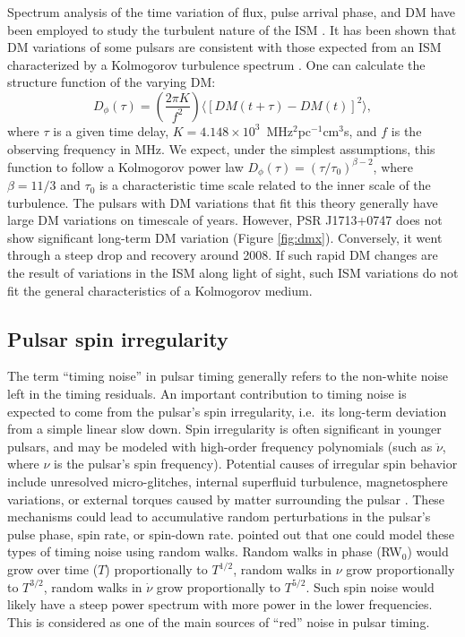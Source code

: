 Spectrum analysis of the time variation of flux, pulse arrival phase, and DM have 
been employed to study the turbulent nature of the ISM \citep[e.g.][]{cpl86, rl90}.
It has been shown that DM variations of some pulsars are consistent with
those expected from an ISM characterized by a Kolmogorov turbulence spectrum
\citep{cwd+90, ric90, ktr94, yhc+07, kcs+13, fst14}. One can calculate the 
structure function of the varying DM: 
\begin{equation}
D_{\phi}(\tau)=\left(\frac{2\pi K}{f^2}\right)\langle [DM(t+\tau)-DM(t)]^2\rangle, 
\end{equation}
where $\tau$ 
is a given time delay, $K=4.148\times10^3$~MHz$^2$pc$^{-1}$cm$^3$s, and $f$ is 
the observing frequency in MHz. We expect, under the simplest assumptions, 
this function to follow a Kolmogorov power law $D_{\phi}(\tau)=(\tau/\tau_0)^{\beta -2}$, 
where $\beta=11/3$ and $\tau_0$ is a characteristic time scale related to 
the inner scale of the turbulence. The pulsars with DM variations that fit this
theory generally have large DM variations on timescale of 
years. However, PSR J1713+0747 does not show significant long-term DM variation 
(Figure \ref{fig:dmx}). Conversely, it went through a steep drop and recovery 
around 2008. If such rapid DM changes are the result of variations in the ISM along
light of sight, such ISM variations do not fit the general characteristics of
a Kolmogorov medium. 


\subsection{Pulsar spin irregularity}
\label{sec:spin}

The term ``timing noise'' in pulsar timing generally refers to the non-white
noise left in the timing residuals.
An important contribution to timing noise is expected to come from the pulsar's spin
irregularity, i.e.~its long-term deviation from a simple linear slow down. 
Spin irregularity is often significant in younger pulsars, and 
may be modeled with high-order frequency polynomials (such as $\ddot{\nu}$, where $\nu$ is the pulsar's spin frequency). 
Potential causes of irregular spin behavior include unresolved
micro-glitches, internal superfluid turbulence, magnetosphere variations, or external torques caused by matter surrounding the pulsar \citep{hlk10, ymh+13, ml14}.
These mechanisms could lead to accumulative random perturbations in the 
pulsar's pulse phase, spin rate, or spin-down rate. 
\citet{sc10} pointed out that one could model these types of timing noise using random walks.
Random walks in phase (RW$_0$) would grow over time ($T$)
proportionally to $T^{1/2}$, random walks in $\nu$ grow proportionally to
$T^{3/2}$, random walks in
$\dot{\nu}$ grow proportionally to $T^{5/2}$.
Such spin noise would likely have a steep power spectrum with more power in
the lower frequencies. This
is considered as one of the main sources of ``red'' noise in pulsar timing.


